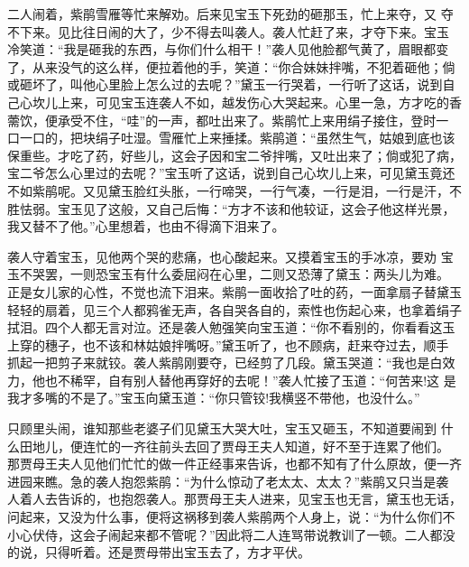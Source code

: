二人闹着，紫鹃雪雁等忙来解劝。后来见宝玉下死劲的砸那玉，忙上来夺，又
夺不下来。见比往日闹的大了，少不得去叫袭人。袭人忙赶了来，才夺下来。宝玉
冷笑道：“我是砸我的东西，与你们什么相干！”袭人见他脸都气黄了，眉眼都变
了，从来没气的这么样，便拉着他的手，笑道：“你合妹妹拌嘴，不犯着砸他；倘
或砸坏了，叫他心里脸上怎么过的去呢？”黛玉一行哭着，一行听了这话，说到自
己心坎儿上来，可见宝玉连袭人不如，越发伤心大哭起来。心里一急，方才吃的香
薷饮，便承受不住，“哇”的一声，都吐出来了。紫鹃忙上来用绢子接住，登时一
口一口的，把块绢子吐湿。雪雁忙上来捶揉。紫鹃道：“虽然生气，姑娘到底也该
保重些。才吃了药，好些儿，这会子因和宝二爷拌嘴，又吐出来了；倘或犯了病，
宝二爷怎么心里过的去呢？”宝玉听了这话，说到自己心坎儿上来，可见黛玉竟还
不如紫鹃呢。又见黛玉脸红头胀，一行啼哭，一行气凑，一行是泪，一行是汗，不
胜怯弱。宝玉见了这般，又自己后悔：“方才不该和他较证，这会子他这样光景，
我又替不了他。”心里想着，也由不得滴下泪来了。

袭人守着宝玉，见他两个哭的悲痛，也心酸起来。又摸着宝玉的手冰凉，要劝
宝玉不哭罢，一则恐宝玉有什么委屈闷在心里，二则又恐薄了黛玉：两头儿为难。
正是女儿家的心性，不觉也流下泪来。紫鹃一面收拾了吐的药，一面拿扇子替黛玉
轻轻的扇着，见三个人都鸦雀无声，各自哭各自的，索性也伤起心来，也拿着绢子
拭泪。四个人都无言对泣。还是袭人勉强笑向宝玉道：“你不看别的，你看看这玉
上穿的穗子，也不该和林姑娘拌嘴呀。”黛玉听了，也不顾病，赶来夺过去，顺手
抓起一把剪子来就铰。袭人紫鹃刚要夺，已经剪了几段。黛玉哭道：“我也是白效
力，他也不稀罕，自有别人替他再穿好的去呢！”袭人忙接了玉道：“何苦来!这
是我才多嘴的不是了。”宝玉向黛玉道：“你只管铰!我横竖不带他，也没什么。”

只顾里头闹，谁知那些老婆子们见黛玉大哭大吐，宝玉又砸玉，不知道要闹到
什么田地儿，便连忙的一齐往前头去回了贾母王夫人知道，好不至于连累了他们。
那贾母王夫人见他们忙忙的做一件正经事来告诉，也都不知有了什么原故，便一齐
进园来瞧。急的袭人抱怨紫鹃：“为什么惊动了老太太、太太？”紫鹃又只当是袭
人着人去告诉的，也抱怨袭人。那贾母王夫人进来，见宝玉也无言，黛玉也无话，
问起来，又没为什么事，便将这祸移到袭人紫鹃两个人身上，说：“为什么你们不
小心伏侍，这会子闹起来都不管呢？”因此将二人连骂带说教训了一顿。二人都没
的说，只得听着。还是贾母带出宝玉去了，方才平伏。


